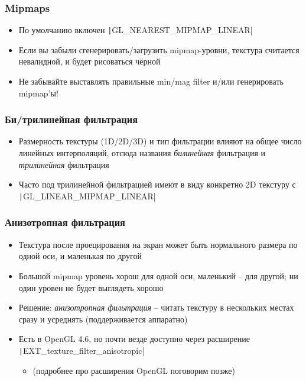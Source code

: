 \documentclass[10pt]{beamer}
\begin{document}
\begin{frame}[fragile]
\frametitle{Mipmaps}
\begin{itemize}
\item По умолчанию включен \texttt|GL_NEAREST_MIPMAP_LINEAR|
\pause
\item Если вы забыли сгенерировать/загрузить mipmap-уровни, текстура считается невалидной, и будет рисоваться чёрной
\pause
\item Не забывайте выставлять правильные min/mag filter и/или генерировать mipmap'ы!
\end{itemize}
\end{frame}

\begin{frame}[fragile]
\frametitle{Би/трилинейная фильтрация}
\begin{itemize}
\item Размерность текстуры (1D/2D/3D) и тип фильтрации влияют на общее число линейных интерполяций, отсюда названия \textit{билинейная} фильтрация и \textit{трилинейная} фильтрация
\pause
\item Часто под трилинейной фильтрацией имеют в виду конкретно 2D текстуру с \texttt|GL_LINEAR_MIPMAP_LINEAR|
\end{itemize}
\end{frame}

\begin{frame}[fragile]
\frametitle{Анизотропная фильтрация}
\begin{itemize}
\item Текстура после проецирования на экран может быть нормального размера по одной оси, и маленькая по другой
\pause
\item Большой mipmap уровень хорош для одной оси, маленький -- для другой; ни один уровен не будет выглядеть хорошо
\pause
\item Решение: \textit{анизотропная фильтрация} -- читать текстуру в нескольких местах сразу и усреднять (поддерживается аппаратно)
\pause
\item Есть в OpenGL 4.6, но почти везде доступно через расширение \texttt|EXT_texture_filter_anisotropic|
\begin{itemize}
\item (подробнее про расширения OpenGL поговорим позже)
\end{itemize}
\end{itemize}
\end{frame}
\end{document}
